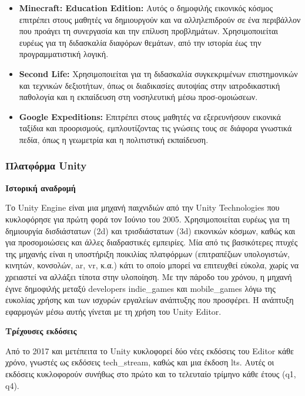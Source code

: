 \begin{itemize}
    \item \textbf{Minecraft: Education Edition:} Αυτός ο δημοφιλής εικονικός κόσμος επιτρέπει στους μαθητές να δημιουργούν και να αλληλεπιδρούν σε ένα περιβάλλον που προάγει τη συνεργασία και την επίλυση προβλημάτων. Χρησιμοποιείται ευρέως για τη διδασκαλία διαφόρων θεμάτων, από την ιστορία έως την προγραμματιστική λογική\cite{noauthor_explore_nodate}.
    \item \textbf{Second Life:} Χρησιμοποιείται για τη διδασκαλία συγκεκριμένων επιστημονικών και τεχνικών δεξιοτήτων, όπως οι διαδικασίες αυτοψίας στην ιατροδικαστική παθολογία και η εκπαίδευση στη νοσηλευτική μέσω προσ-ομοιώσεων\cite{staff_20_2022}.
    \item \textbf{Google Expeditions:} Επιτρέπει στους μαθητές να εξερευνήσουν εικονικά ταξίδια και προορισμούς, εμπλουτίζοντας τις γνώσεις τους σε διάφορα γνωστικά πεδία, όπως η γεωμετρία και η πολιτιστική εκπαίδευση\cite{noauthor_benefits_2019}.
\end{itemize}

\subsubsection{Πλατφόρμα Unity}

\textbf{Ιστορική αναδρομή}

Το Unity Engine\cite{noauthor_real-time_nodate} είναι μια μηχανή παιχνιδιών από την Unity Technologies που κυκλοφόρησε για πρώτη φορά τον Ιούνιο του 2005. Χρησιμοποιείται ευρέως για τη δημιουργία δισδιάστατων (\acrshort{2d}) και τρισδιάστατων (\acrshort{3d}) εικονικών κόσμων, καθώς και για προσομοιώσεις και άλλες διαδραστικές εμπειρίες. Μία από τις βασικότερες πτυχές της μηχανής είναι η υποστήριξη ποικιλίας πλατφόρμων (επιτραπέζιων υπολογιστών, κινητών, κονσολών, \acrshort{ar}, \acrshort{vr}, κ.α.) κάτι το οποίο μπορεί να επιτευχθεί εύκολα, χωρίς να χρειαστεί να αλλάξει τίποτα στην υλοποίηση. Με την πάροδο του χρόνου, η μηχανή έγινε δημοφιλής μεταξύ \glspl{developer} \glspl{indie_game} και \glspl{mobile_game} λόγω της ευκολίας χρήσης και των ισχυρών εργαλείων ανάπτυξης που προσφέρει. Η ανάπτυξη εφαρμογών μέσω αυτής γίνεται με τη χρήση του Unity Editor\cite{noauthor_unity_2024,haas_history_2014}.

\textbf{Τρέχουσες εκδόσεις}

Από το 2017 και μετέπειτα\cite{noauthor_unity_nodate} το Unity κυκλοφορεί δύο νέες εκδόσεις του Editor κάθε χρόνο, γνωστές ως εκδόσεις \gls{tech_stream}, καθώς και μια έκδοση \acrshort{lts}. Αυτές οι εκδόσεις κυκλοφορούν συνήθως στο πρώτο και το τελευταίο τρίμηνο κάθε έτους (\gls{q1}, \gls{q4}).

